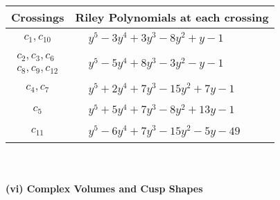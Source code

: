 \documentclass[1p]{elsarticle_modified}
\theoremstyle{definition}
\begin{document}
\begin{tabular}{m{50pt}|m{274pt}}
Crossings & \hspace{64pt}Riley Polynomials at each crossing \\
\hline $$\begin{aligned}c_{1},c_{10}\end{aligned}$$&$\begin{aligned}
&y^5-3 y^4+3 y^3-8 y^2+y-1
\end{aligned}$\\
\hline $$\begin{aligned}c_{2},c_{3},c_{6}\\c_{8},c_{9},c_{12}\end{aligned}$$&$\begin{aligned}
&y^5-5 y^4+8 y^3-3 y^2- y-1
\end{aligned}$\\
\hline $$\begin{aligned}c_{4},c_{7}\end{aligned}$$&$\begin{aligned}
&y^5+2 y^4+7 y^3-15 y^2+7 y-1
\end{aligned}$\\
\hline $$\begin{aligned}c_{5}\end{aligned}$$&$\begin{aligned}
&y^5+5 y^4+7 y^3-8 y^2+13 y-1
\end{aligned}$\\
\hline $$\begin{aligned}c_{11}\end{aligned}$$&$\begin{aligned}
&y^5-6 y^4+7 y^3-15 y^2-5 y-49
\end{aligned}$\\
\hline
\end{tabular}\\~\\
\newpage\flushleft \textbf{(vi) Complex Volumes and Cusp Shapes}
\end{document}
